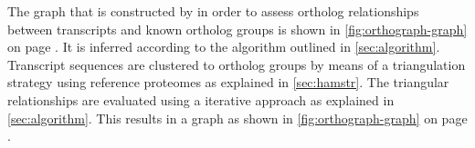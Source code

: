 \label{sec:graph}

The graph that is constructed by \pname in order to assess ortholog
relationships between transcripts and known ortholog groups is shown in
\autoref{fig:orthograph-graph} on page \pageref{fig:graph}. It is inferred
according to the algorithm outlined in \autoref{sec:algorithm}. Transcript
sequences are clustered to ortholog groups by means of a triangulation strategy
using reference proteomes as explained in \autoref{sec:hamstr}. The triangular
relationships are evaluated using a iterative approach as explained in
\autoref{sec:algorithm}. This results in a graph as shown in
\autoref{fig:orthograph-graph} on page \pageref{fig:orthograph-graph}.

